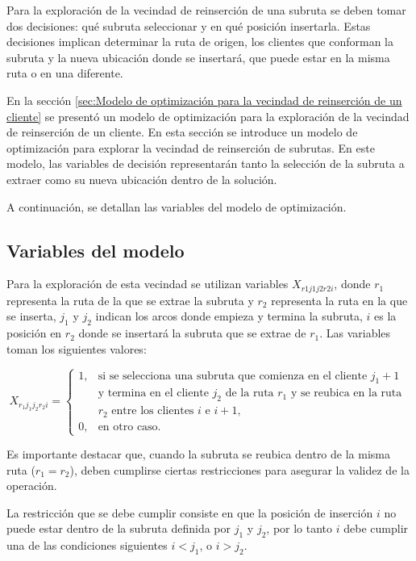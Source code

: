 \documentclass[12pt]{report}
\begin{document}
	Para la exploración de la vecindad de reinserción de una subruta se deben tomar dos decisiones: qué subruta seleccionar y en qué posición insertarla. Estas decisiones implican determinar la ruta de origen, los clientes que conforman la subruta y la nueva ubicación donde se insertará, que puede estar en la misma ruta o en una diferente.

	En la sección \ref{sec:Modelo de optimización para la vecindad de reinserción de un cliente} se presentó un modelo de optimización para la exploración de la vecindad de reinserción de un cliente. En esta sección se introduce un modelo de optimización para explorar la vecindad de reinserción de subrutas. En este modelo, las variables de decisión representarán tanto la selección de la subruta a extraer como su nueva ubicación dentro de la solución.

	A continuación, se detallan las variables del modelo de optimización.

	\subsection{Variables del modelo}

	Para la exploración de esta vecindad se utilizan variables $X_{r1j1j2r2i}$, donde $r_1$ representa la ruta de la que se extrae la subruta y $r_2$ representa la ruta en la que se inserta, $j_1$ y $j_2$ indican los arcos donde empieza y termina la subruta, $i$ es la posición en $r_2$ donde se insertará la subruta que se extrae de $r_1$. Las variables toman los siguientes valores:

		\[
		X_{r_1 j_1 j_2 r_2 i} =
		\begin{cases}
			1,  & \text{si se selecciona una subruta que comienza en el cliente $j_1 +1$}\\
				& \text{y termina en el cliente $j_2$ de la ruta $r_1$ y se reubica en la ruta }\\
				& \text{$r_2$ entre los clientes $i$ e $i+1$,}\\
			0,  & \text{en otro caso.}
		\end{cases}
		\]

	Es importante destacar que, cuando la subruta se reubica dentro de la misma ruta ($r_1=r_2$), deben cumplirse ciertas restricciones para asegurar la validez de la operación.

    La restricción que se debe cumplir consiste en que la posición de inserción $i$ no puede estar dentro de la subruta definida por $j_1$ y $j_2$, por lo tanto $i$ debe cumplir una de las condiciones siguientes $i < j_1$, o $i>j_2$.
\end{document}
